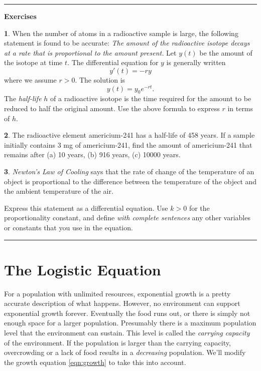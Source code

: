 \documentclass[reqno]{immbook}
\numberwithin{equation}{chapter}
\numberwithin{question}{section}
\numberwithin{theorem}{chapter}
\numberwithin{figure}{chapter}
\theoremstyle{definition}
\newtheorem{exercise}{}[section]
\newenvironment{exercises}%
{%
\medskip\hrule\medskip\noindent\textbf{Exercises}%
}%
{%
\medskip\hrule
}
\begin{document}
\newpage

\begin{exercises}
\begin{exercise}
\label{ex:UnconstrPopGrowth_halflife_formula}
When the number of atoms in a radioactive sample is large,
the following statement is found to be accurate:
\emph{The amount of the radioactive isotope decays at 
a rate that is proportional to the amount present.}
Let $y(t)$ be the amount of the isotope at time $t$.
The differential equation for $y$ is generally written
\[
   y'(t) = -ry
\]
where we assume $r > 0$.  The solution is
\[
   y(t) = y_0 e^{-rt}.
\]
The \emph{half-life} $h$ of a radioactive
isotope is the time required for the amount to be reduced
to half the original amount.
Use the above formula to express $r$ in terms of $h$.
\end{exercise}
\begin{exercise}
\label{ex:UnconstrPopGrowth_americium}
The radioactive element americium-241 has a half-life
of 458 years.
If a sample initially contains 3 mg of americium-241,
find the amount of americium-241 that remains
after (a) 10 years, (b) 916 years, (c) 10000 years.
\end{exercise}
\begin{exercise}
\label{ex:NewtonsLawOfCooling}
\emph{Newton's Law of Cooling}
says that the rate of change
of the temperature of an object is proportional
to the difference between the temperature of the object
and the ambient temperature of the air.

Express this statement as a differential equation.
Use $k>0$ for the proportionality constant, and define
\emph{with complete sentences}
any other variables or constants that you use in the equation.

\end{exercise}
\end{exercises}

\newpage

\section{The Logistic Equation}

For a population with unlimited resources, exponential growth
is a pretty accurate description of what happens.
However, no environment can support exponential growth forever.
Eventually the food runs out, or there is simply not enough space
for a larger population.
Presumably there is a maximum population level that the environment
can sustain.  This level is called the
\emph{carrying capacity}
of the environment. If the population is larger than the
carrying capacity, overcrowding or a lack of food results in a
\emph{decreasing} population.
We'll modify the growth equation
\eqref{eqn:growth} to take this into account.
\end{document}
